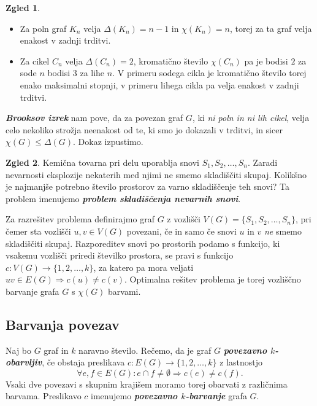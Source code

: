 \documentclass[11pt]{book}
\def\definicija{\color{rdeca}\bf\em}
\theoremstyle{definition}
\theoremstyle{zgled}
\newtheorem*{zgled}{Zgled}
\theoremstyle{odprtproblem}
\theoremstyle{domacanaloga}
\theoremstyle{izrek}
\begin{document}
\begin{zgled} \leavevmode
\begin{itemize}
    \item Za poln graf $K_n$ velja $\Delta(K_n) = n-1$ in $\chi(K_n) = n$, torej za ta graf velja enakost v zadnji trditvi.
    \item Za cikel $C_n$ velja $\Delta(C_n) = 2$, kromatično število $\chi(C_n)$ pa je bodisi $2$ za sode $n$ bodisi $3$ za lihe $n$. V primeru sodega cikla je kromatično število torej enako maksimalni stopnji, v primeru lihega cikla pa velja enakost v zadnji trditvi.
\end{itemize}
\end{zgled}

{\definicija Brooksov izrek} nam pove, da za povezan graf $G$, ki \emph{ni poln in ni lih cikel}, velja celo nekoliko strožja neenakost od te, ki smo jo dokazali v trditvi, in sicer $\chi(G) \leq \Delta(G)$. Dokaz izpustimo. 

\begin{zgled}
Kemična tovarna pri delu uporablja snovi $S_1, S_2, \dots, S_n$. Zaradi nevarnosti eksplozije nekaterih med njimi ne smemo skladiščiti skupaj. Kolikšno je najmanjše potrebno število prostorov za varno skladiščenje teh snovi? Ta problem imenujemo {\definicija problem skladiščenja nevarnih snovi}.

Za razrešitev problema definirajmo graf $G$ z vozlišči $V(G) = \{ S_1, S_2, \dots, S_n \}$, pri čemer sta vozlišči $u,v \in V(G)$ povezani, če in samo če snovi $u$ in $v$ \emph{ne} smemo skladiščiti skupaj. Razporeditev snovi po prostorih podamo s funkcijo, ki vsakemu vozlišči priredi številko prostora, se pravi s funkcijo $c \colon V(G) \to \{ 1, 2, \dots, k \}$, za katero pa mora veljati $uv \in E(G) \Rightarrow c(u) \neq c(v)$. Optimalna rešitev problema je torej vozliščno barvanje grafa $G$ s $\chi(G)$ barvami.
\end{zgled}

\subsection{Barvanja povezav}

Naj bo $G$ graf in $k$ naravno število. Rečemo, da je graf $G$ {\definicija povezavno $k$-obarvljiv}, če obstaja preslikava $c \colon E(G) \to \{ 1,2, \dots, k\}$ z lastnostjo
\[
    \forall e,f \in E(G) \colon e \cap f \neq \emptyset \Rightarrow c(e) \neq c(f).
\]
Vsaki dve povezavi s skupnim krajišem moramo torej obarvati z različnima barvama. Preslikavo $c$ imenujemo {\definicija povezavno $k$-barvanje} grafa $G$.
\end{document}
